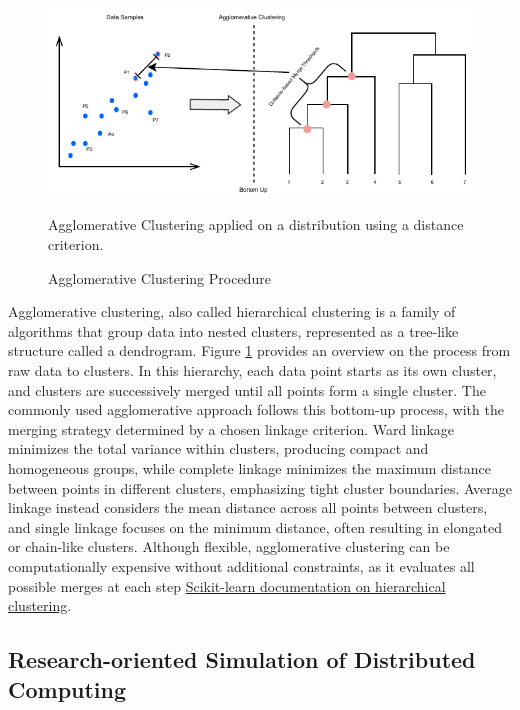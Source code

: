 \begin{figure}[H]
    \centering
    \includegraphics{fig/02/02-clustering.pdf}
    \caption{Agglomerative Clustering Procedure}
    \label{fig:02-clustering}
    \tiny
    Agglomerative Clustering applied on a distribution using a distance criterion.
\end{figure}

Agglomerative clustering, also called hierarchical clustering is a family of algorithms that group data into nested clusters, represented as a tree-like structure called a dendrogram. Figure \ref{fig:02-clustering} provides an overview on the process from raw data to clusters. In this hierarchy, each data point starts as its own cluster, and clusters are successively merged until all points form a single cluster. The commonly used agglomerative approach follows this bottom-up process, with the merging strategy determined by a chosen linkage criterion. Ward linkage minimizes the total variance within clusters, producing compact and homogeneous groups, while complete linkage minimizes the maximum distance between points in different clusters, emphasizing tight cluster boundaries. Average linkage instead considers the mean distance across all points between clusters, and single linkage focuses on the minimum distance, often resulting in elongated or chain-like clusters. Although flexible, agglomerative clustering can be computationally expensive without additional constraints, as it evaluates all possible merges at each step \href{https://scikit-learn.org/stable/modules/clustering.html#hierarchical-clustering}{Scikit-learn documentation on hierarchical clustering}.

\subsection{Research-oriented Simulation of Distributed Computing}
\label{sec:background_simulation}

